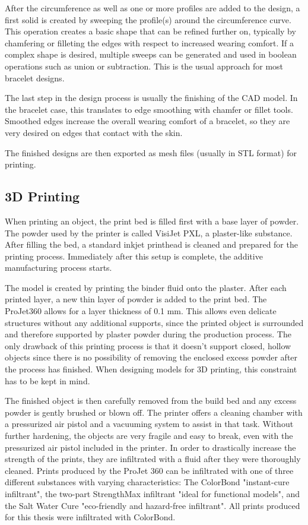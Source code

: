 After the circumference as well as one or more profiles are added to the design, a first solid is created by sweeping the profile(s) around the circumference curve. This operation creates a basic shape that can be refined further on, typically by chamfering or filleting the edges with respect to increased wearing comfort. If a complex shape is desired, multiple sweeps can be generated and used in boolean operations such as union or subtraction. This is the usual approach for most bracelet designs.

The last step in the design process is usually the finishing of the \ac{CAD} model. In the bracelet case, this translates to edge smoothing with chamfer or fillet tools. Smoothed edges increase the overall wearing comfort of a bracelet, so they are very desired on edges that contact with the skin.

The finished designs are then exported as mesh files (usually in \ac{STL} format) for printing.

\subsection{3D Printing}
When printing an object, the print bed is filled first with a base layer of powder. The powder used by the printer is called VisiJet PXL, a plaster-like substance. After filling the bed, a standard inkjet printhead is cleaned and prepared for the printing process. Immediately after this setup is complete, the additive manufacturing process starts.

The model is created by printing the binder fluid onto the plaster. After each printed layer, a new thin layer of powder is added to the print bed. The ProJet360 allows for a layer thickness of 0.1 mm\cite{datasheet_printer}. This allows even delicate structures without any additional supports, since the printed object is surrounded and therefore supported by plaster powder during the production process. The only drawback of this printing process is that it doesn't support closed, hollow objects since there is no possibility of removing the enclosed excess powder after the process has finished. When designing models for 3D printing, this constraint has to be kept in mind.

The finished object is then carefully removed from the build bed and any excess powder is gently brushed or blown off. The printer offers a cleaning chamber with a pressurized air pistol and a vacuuming system to assist in that task. Without further hardening, the objects are very fragile and easy to break, even with the pressurized air pistol included in the printer. In order to drastically increase the strength of the prints, they are infiltrated with a fluid after they were thoroughly cleaned. Prints produced by the ProJet 360 can be infiltrated with one of three different substances with varying characteristics: The ColorBond "instant-cure infiltrant", the two-part StrengthMax infiltrant "ideal for functional models", and the Salt Water Cure "eco-friendly and hazard-free infiltrant"\cite{datasheet_printer}. All prints produced for this thesis were infiltrated with ColorBond.


